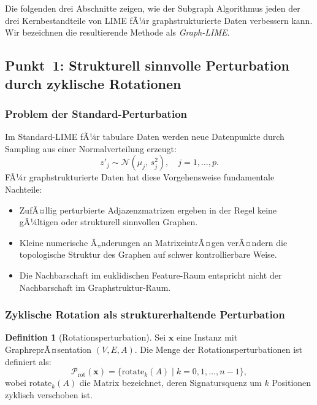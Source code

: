 ﻿\documentclass[a4paper,12pt]{article}
\theoremstyle{definition}
\newtheorem{definition}{Definition}[section]
\begin{document}
Die folgenden drei Abschnitte zeigen, wie der Subgraph Algorithmus jeden der drei
Kernbestandteile von LIME fÃ¼r graphstrukturierte Daten verbessern kann.
Wir bezeichnen die resultierende Methode als \emph{Graph-LIME}.

\subsection{Punkt~1: Strukturell sinnvolle Perturbation durch zyklische Rotationen}

\subsubsection{Problem der Standard-Perturbation}

Im Standard-LIME fÃ¼r tabulare Daten werden neue Datenpunkte durch Sampling aus einer
Normalverteilung erzeugt:
\[
  z'_j \sim \mathcal{N}(\mu_j,\, s_j^2), \quad j = 1, \ldots, p.
\]
FÃ¼r graphstrukturierte Daten hat diese Vorgehensweise fundamentale Nachteile:
\begin{itemize}
  \item ZufÃ¤llig perturbierte Adjazenzmatrizen ergeben in der Regel keine
        gÃ¼ltigen oder strukturell sinnvollen Graphen.
  \item Kleine numerische Ã„nderungen an MatrixeintrÃ¤gen verÃ¤ndern die topologische
        Struktur des Graphen auf schwer kontrollierbare Weise.
  \item Die Nachbarschaft im euklidischen Feature-Raum entspricht nicht der
        Nachbarschaft im Graphstruktur-Raum.
\end{itemize}

\subsubsection{Zyklische Rotation als strukturerhaltende Perturbation}

\begin{definition}[Rotationsperturbation]
  Sei $\mathbf{x}$ eine Instanz mit GraphreprÃ¤sentation $(V, E, A)$.
  Die Menge der Rotationsperturbationen ist definiert als:
  \[
    \mathcal{P}_{\mathrm{rot}}(\mathbf{x})
    = \bigl\{\mathrm{rotate}_k(A) \;\big|\; k = 0, 1, \ldots, n-1\bigr\},
  \]
  wobei $\mathrm{rotate}_k(A)$ die Matrix bezeichnet, deren Signatursquenz um $k$
  Positionen zyklisch verschoben ist.
\end{definition}
\end{document}
